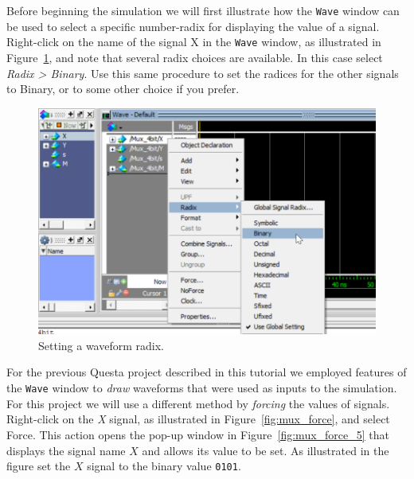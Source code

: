 \documentclass[11pt, twoside, pdftex]{article}
\begin{document}
Before beginning the simulation we will first illustrate how the \texttt{Wave} window
can be used to select a specific number-radix for displaying the value of a signal. 
Right-click on the name of the signal {\sf X} in the \texttt{Wave} window, as illustrated 
in Figure~\ref{fig:mux_radix}, and note that several radix choices are available. In this 
case select {\it Radix > Binary}. Use this same procedure to set the radices for the other
signals to {\sf Binary}, or to some other choice if you prefer.

\begin{figure}[H]
   \begin{center}
      \includegraphics[scale=.75]{figures/mux_radix.png}
   \caption{Setting a waveform radix.} 
	 \label{fig:mux_radix}
	 \end{center}
\end{figure}

For the previous Questa project described in this tutorial we employed features of the 
\texttt{Wave} window to {\it draw} waveforms that were used as inputs to the simulation. 
For this project we will use a different method by {\it forcing} the values of signals. 
Right-click on the {\it X} signal, as illustrated in Figure~\ref{fig:mux_force}, and 
select {\sf Force}. This action opens the pop-up window in Figure~\ref{fig:mux_force_5} that 
displays the signal name $X$ and allows its value to be set.  As illustrated in
the figure set the $X$ signal to the binary value \texttt{0101}.
\end{document}
